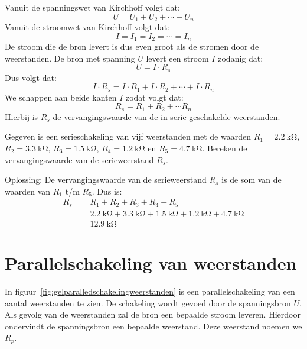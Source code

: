 Vanuit de spanningswet van Kirchhoff volgt dat:
%
\begin{equation}
U=U_1+U_2+\cdots+U_n
\end{equation}
%
Vanuit de stroomwet van Kirchhoff volgt dat:
%
\begin{equation}
I = I_1 = I_2 = \cdots = I_n
\end{equation}
%
De stroom die de bron levert is dus even groot als de stromen door de weerstanden.
De bron met spanning $U$ levert een stroom $I$ zodanig dat:
%
\begin{equation}
U=I\cdot R_s
\end{equation}
%
Dus volgt dat:
%
\begin{equation}
I\cdot R_s = I\cdot R_1+I\cdot R_2+\cdots+I\cdot R_n
\end{equation}
%
We schappen aan beide kanten $I$ zodat volgt dat:
%
\begin{equation}
R_s = R_1 + R_2 + \cdots R_n
\end{equation}
%
Hierbij is $R_s$ de vervangingswaarde van de in serie geschakelde weerstanden.

\begin{example}
Gegeven is een serieschakeling van vijf weerstanden met de waarden $R_1=\SI{2.2}{\kilo\ohm}$,
$R_2=\SI{3.3}{\kilo\ohm}$, $R_3=\SI{1.5}{\kilo\ohm}$, $R_4=\SI{1.2}{\kilo\ohm}$ en
$R_5=\SI{4.7}{\kilo\ohm}$. Bereken de vervangingswaarde van de serieweerstand $R_s$.

Oplossing: De vervangingswaarde van de serieweerstand $R_s$ is de som van de waarden van $R_1$
t/m $R_5$. Dus is:
\begin{equation}
\begin{split}
R_s &= R_1 + R_2 + R_3 + R_4 + R_5\\
    &= \SI{2.2}{\kilo\ohm} + \SI{3.3}{\kilo\ohm} +
        \SI{1.5}{\kilo\ohm} + \SI{1.2}{\kilo\ohm} + \SI{4.7}{\kilo\ohm} \\
    &= \SI{12.9}{\kilo\ohm} 
\end{split}
\end{equation}
\end{example}

\section{Parallelschakeling van weerstanden}
In figuur~\ref{fig:gelparalledschakelingweerstanden} is een parallelschakeling van een
aantal weerstanden te zien. De schakeling wordt gevoed door de spanningsbron $U$. Als
gevolg van de weerstanden zal de bron een bepaalde stroom leveren. Hierdoor ondervindt
de spanningsbron een bepaalde weerstand. Deze weerstand noemen we $R_p$.

